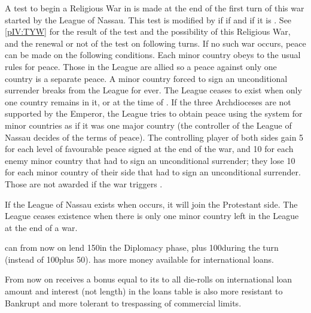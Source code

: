 \phpaix
\aparag A test to begin a Religious War in \HRE is made at the end of the
first turn of this war started by the League of Nassau.  This test is modified
by  if \SPA if \CATHCR and  if it is \CATHCO. See
\ref{pIV:TYW} for the result of the test and the possibility of this Religious
War, and the renewal or not of the test on following turns.  If no such war
occurs, peace can be made on the following conditions.
\aparag Each minor country obeys to the usual rules for peace. Those in the
League are allied so a peace against only one country is a separate peace.
\aparag A minor country forced to sign an unconditional surrender breaks from
the League for ever. The League ceases to exist when only one country remains
in it, or at the time of .
\aparag If the three Archdioceses are not supported by the Emperor, the League
tries to obtain peace using the system for minor countries as if it was one
major country (the controller of the League of Nassau decides of the terms of
peace).
\aparag The controlling player of both sides gain 5 \PV for each level of
favourable peace signed at the end of the war, and 10 \PV for each enemy minor
country that had to sign an unconditional surrender; they lose 10 \PV for each
minor country of their side that had to sign an unconditional surrender.
Those \PV are not awarded if the war triggers .

\effetlong
\aparag If the League of Nassau exists when  occurs, it will
join the Protestant side. The League ceases existence when there is only one
minor country left in the League at the end of a war.





\effetlong
\aparag \HOL can from now on lend 150\ducats in the Diplomacy phase, plus
100\ducats during the turn (instead of 100\ducats plus 50\ducats).
\aparag \HOL has more money available for international loans.
\begin{oldcompta}
  \aparag From now on \HOL receives a bonus equal to its \DTI to all die-rolls
  on international loan amount and interest (not length) in the loans table
  \aparag \HOL is also more resistant to Bankrupt and more tolerant to
  trespassing of commercial limits.
\end{oldcompta}



